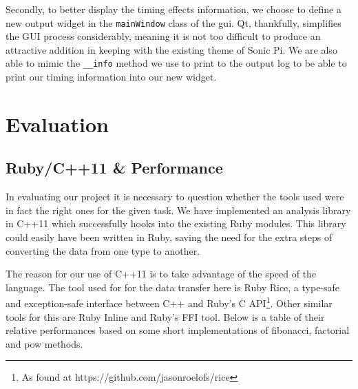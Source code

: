 \documentclass[11pt, abstracton, twoside, titlepage=true]{scrartcl}
\begin{document}
Secondly, to better display the timing effects information, we choose to define 
a new output widget in the \texttt{mainWindow} class of the gui. Qt, thankfully, 
simplifies the GUI process considerably, meaning it is not too difficult to produce
an attractive addition in keeping with the existing theme of Sonic Pi. We are 
also able to mimic the \texttt{\_\_info} method we use to print to the output log
to be able to print our timing information into our new widget.



\newpage

\section{Evaluation}
\thispagestyle{empty}
\subsection{Ruby/C++11 \& Performance}
In evaluating our project it is necessary to question whether the tools used were
in fact the right ones for the given task. We have implemented an analysis library
in C++11 which successfully hooks into the existing Ruby modules. This library
could easily have been written in Ruby, saving the need for the extra steps
of converting the data from one type to another. 

The reason for our
use of C++11 is to take advantage of the speed of the language. The tool used for
for the data transfer here is Ruby Rice, a type-safe and exception-safe interface
between C++ and Ruby's C API\footnote{As found at https://github.com/jasonroelofs/rice}.
Other similar tools for this are Ruby Inline and Ruby's FFI tool. Below is a table
of their relative performances based on some short implementations of fibonacci, 
factorial and pow methods.
\end{document}
